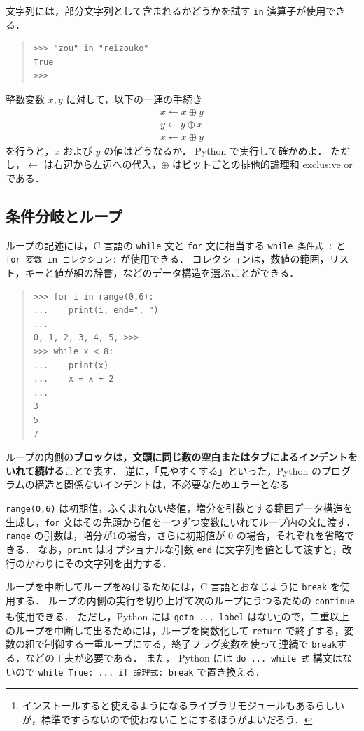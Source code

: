 \documentclass[11pt,a4,epsf]{report}
\begin{document}
文字列には，部分文字列として含まれるかどうかを試す \verb+in+ 演算子が使用できる．
\begin{quote}
\small
\begin{verbatim}
>>> "zou" in "reizouko"
True
>>>\end{verbatim}
\end{quote}

\begin{excercise}
整数変数 $x, y$ に対して，以下の一連の手続き
\begin{eqnarray*}
x \leftarrow x \oplus y \\
y \leftarrow y \oplus x \\
x \leftarrow x \oplus y
\end{eqnarray*}
を行うと，$x$ および $y$ の値はどうなるか．
Python で実行して確かめよ．
ただし，$\leftarrow$ は右辺から左辺への代入，$\oplus$ はビットごとの排他的論理和 exclusive or である．
\end{excercise}

\subsection{条件分岐とループ}

ループの記述には，C 言語の \verb+while+ 文と \verb+for+ 文に相当する \verb+while 条件式 :+ と \verb+for 変数 in コレクション:+ が使用できる．
コレクションは，数値の範囲，リスト，キーと値が組の辞書，などのデータ構造を選ぶことができる．
\begin{quote}
\small
\begin{verbatim}
>>> for i in range(0,6):
...    print(i, end=", ")
...
0, 1, 2, 3, 4, 5, >>>
>>> while x < 8:
...    print(x)
...    x = x + 2
...
3
5
7
\end{verbatim}
\end{quote}
ループの内側の{\bf ブロックは，文頭に同じ数の空白またはタブによるインデントをいれて続ける}ことで表す．
逆に，「見やすくする」といった，Python のプログラムの構造と関係ないインデントは，不必要なためエラーとなる

\verb+range(0,6)+ は初期値，ふくまれない終値，増分を引数とする範囲データ構造を生成し，\verb+for+ 文はその先頭から値を一つずつ変数にいれてループ内の文に渡す．
\verb+range+ の引数は，増分が1の場合，さらに初期値が 0 の場合，それぞれを省略できる．
なお，\verb+print+ はオプショナルな引数 \verb+end+ に文字列を値として渡すと，改行のかわりにその文字列を出力する．

ループを中断してループをぬけるためには，C 言語とおなじように \verb+break+ を使用する．
ループの内側の実行を切り上げて次のループにうつるための \verb+continue+ も使用できる．
ただし，Python には \verb+goto ... label+ はない\footnote{インストールすると使えるようになるライブラリモジュールもあるらしいが，標準ですらないので使わないことにするほうがよいだろう．}ので，二重以上のループを中断して出るためには，ループを関数化して \verb+return+ で終了する，変数の組で制御する一重ループにする，終了フラグ変数を使って連続で \verb+break+する，などの工夫が必要である．
また， Python には \verb+do ... while 式+ 構文はないので \verb+while True: ... if 論理式: break+ で置き換える．
\end{document}
